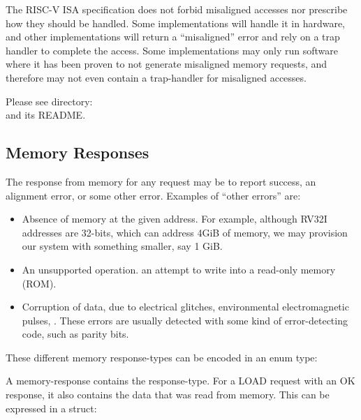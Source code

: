 The RISC-V ISA specification does not forbid misaligned accesses nor
prescribe how they should be handled.  Some implementations will
handle it in hardware, and other implementations will return a
``misaligned'' error and rely on a trap handler to complete the
access.  Some implementations may only run software where it has been
proven to not generate misaligned memory requests, and therefore may
not even contain a trap-handler for misaligned accesses.

\Beginexercise

Please see directory:  \\
and its README.
\Endexercise


\subsection{Memory Responses}

\label{Sec_Mem_Rsp}


The response from memory for any request may be to report success, an
alignment error, or some other error.  Examples of ``other errors''
are:

\begin{itemize}

\item Absence of memory at the given address.  For example, although
  RV32I addresses are 32-bits, which can address 4GiB of memory, we
  may provision our system with something smaller, say 1 GiB.

\item An unsupported operation. {\Eg} an attempt to write into a
  read-only memory (ROM).

\item Corruption of data, due to electrical glitches, environmental
  electromagnetic pulses, {\etc}.  These errors are usually detected
  with some kind of error-detecting code, such as parity bits.

\end{itemize}

These different memory response-types can be encoded in an enum type:


A memory-response contains the response-type. For a LOAD request with
an OK response, it also contains the data that was read from memory.
This can be expressed in a struct:


